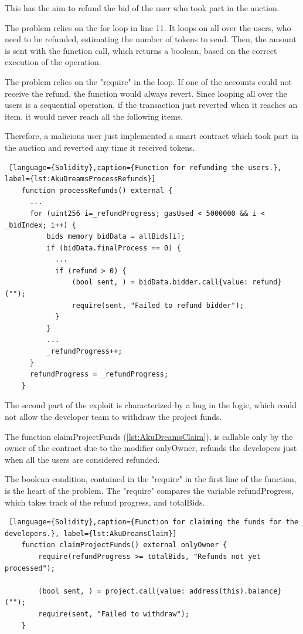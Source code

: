 This has the aim to refund the bid of the user who took part in the auction. 

The problem relies on the for loop in line 11. 
It loops on all over the users, who need to be refunded, estimating the number of tokens to send. 
Then, the amount is sent with the function call, which returns a boolean, based on the correct execution of the operation.

The problem relies on the "require" in the loop. If one of the accounts could not receive the refund, the function would always revert.
Since looping all over the users is a sequential operation, if the transaction just reverted when it reaches an item, it would never reach all the following items. 

Therefore, a malicious user just implemented a smart contract which took part in the auction and reverted any time it received tokens.

\begin{lstlisting} [language={Solidity},caption={Function for refunding the users.}, label={lst:AkuDreamsProcessRefunds}]
    function processRefunds() external {
      ...
      for (uint256 i=_refundProgress; gasUsed < 5000000 && i < _bidIndex; i++) {
          bids memory bidData = allBids[i];
          if (bidData.finalProcess == 0) {
            ...
            if (refund > 0) {
                (bool sent, ) = bidData.bidder.call{value: refund}("");
                require(sent, "Failed to refund bidder");
            }
          }
          ...
          _refundProgress++;
      }
      refundProgress = _refundProgress;
    }
\end{lstlisting}
The second part of the exploit is characterized by a bug in the logic, which could not allow the developer team to withdraw the project funds. 

The function claimProjectFunds (\autoref{lst:AkuDreamsClaim}), is callable only by the owner of the contract due to the modifier onlyOwner, 
refunds the developers just when all the users are considered refunded. 

The boolean condition, contained in the "require" in the first line of the function, is the heart of the problem. 
The "require" compares the variable refundProgress, which takes track of the refund progress, 
and totalBids.
\begin{lstlisting} [language={Solidity},caption={Function for claiming the funds for the developers.}, label={lst:AkuDreamsClaim}]
    function claimProjectFunds() external onlyOwner {
        require(refundProgress >= totalBids, "Refunds not yet processed");

        (bool sent, ) = project.call{value: address(this).balance}("");
        require(sent, "Failed to withdraw");        
    }
\end{lstlisting}

